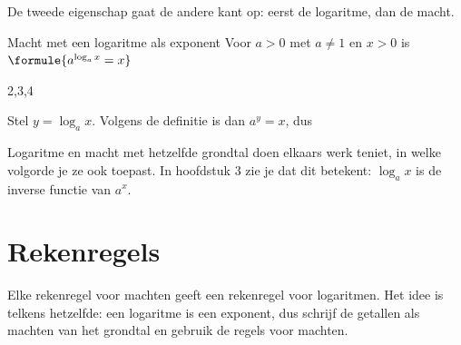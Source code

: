 \begin{oefeningen}
\end{oefeningen}

De tweede eigenschap gaat de andere kant op: eerst de logaritme, dan de macht.

\begin{theorie}
\begin{stelling}{Macht met een logaritme als exponent}
Voor $a > 0$ met $a \neq 1$ en $x > 0$ is \qquad $\formule{a^{\log_a x} = x}$
\end{stelling}
\begin{alleenvoor}{2,3,4}
\begin{bewijs}
Stel $y = \log_a x$. Volgens de definitie is dan $a^y = x$, dus
\end{bewijs}
\end{alleenvoor}
\end{theorie}

Logaritme en macht met hetzelfde grondtal doen elkaars werk teniet, in welke volgorde je ze ook toepast. In hoofdstuk 3 zie je dat dit betekent: $\log_a x$ is de inverse functie van $a^x$.


\begin{oefeningen}
\end{oefeningen}

\section{Rekenregels}

Elke rekenregel voor machten geeft een rekenregel voor logaritmen. Het idee is telkens hetzelfde: een logaritme is een exponent, dus schrijf de getallen als machten van het grondtal en gebruik de regels voor machten.

